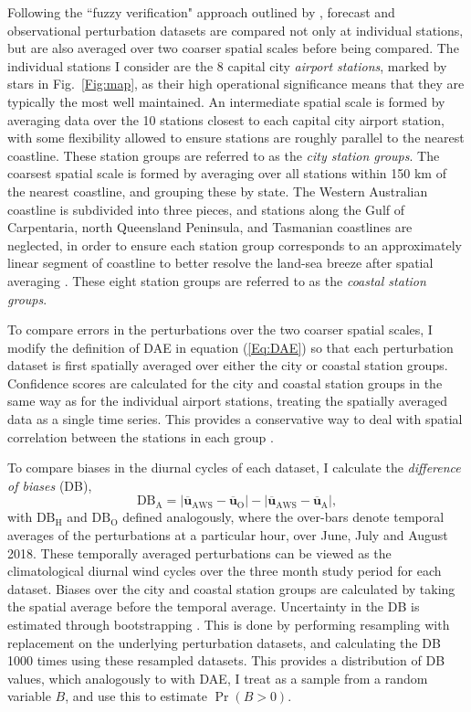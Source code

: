 \documentclass[twocol]{ametsoc}
\DeclareMathOperator{\pr}{Pr}
\begin{document}
Following the ``fuzzy verification" approach outlined by \citet{ebert08}, forecast and observational perturbation datasets are compared not only at individual stations, but are also averaged over two coarser spatial scales before being compared. The individual stations I consider are the 8 capital city \textit{airport stations}, marked by stars in Fig.~\ref{Fig:map}, as their high operational significance means that they are typically the most well maintained. An intermediate spatial scale is formed by averaging data over the 10 stations closest to each capital city airport station, with some flexibility allowed to ensure stations are roughly parallel to the nearest coastline. These station groups are referred to as the \textit{city station groups}. The coarsest spatial scale is formed by averaging over all stations within 150 km of the nearest coastline, and grouping these by state. The Western Australian coastline is subdivided into three pieces, and stations along the Gulf of Carpentaria, north Queensland Peninsula, and Tasmanian coastlines are neglected, in order to ensure each station group corresponds to an approximately linear segment of coastline to better resolve the land-sea breeze after spatial averaging \citep[e.g.][]{vincent16}. These eight station groups are referred to as the \textit{coastal station groups}.

To compare errors in the perturbations over the two coarser spatial scales, I modify the definition of DAE in equation (\ref{Eq:DAE}) so that each perturbation dataset is first spatially averaged over either the city or coastal station groups. Confidence scores are calculated for the city and coastal station groups in the same way as for the individual airport stations, treating the spatially averaged data as a single time series. This provides a conservative way to deal with spatial correlation between the stations in each group \citep{griffiths17}. 

To compare biases in the diurnal cycles of each dataset, I calculate the \textit{difference of biases} (DB),
\begin{equation}
\text{DB}_{\text{A}} = \left\lvert \overline{\mathbf{u}}_{\text{AWS}}-\overline{\mathbf{u}}_{\text{O}} \right\rvert - \left\lvert \overline{\mathbf{u}}_{\text{AWS}}-\overline{\mathbf{u}}_{\text{A}} \right\rvert,
\end{equation}
with $\text{DB}_{\text{H}}$ and $\text{DB}_{\text{O}}$ defined analogously, where the over-bars denote temporal averages of the perturbations at a particular hour, over June, July and August 2018. These temporally averaged perturbations can be viewed as the climatological diurnal wind cycles over the three month study period for each dataset. Biases over the city and coastal station groups are calculated by taking the spatial average before the temporal average. Uncertainty in the DB is estimated through bootstrapping \citep{efron79}. This is done by performing resampling with replacement on the underlying perturbation datasets, and calculating the DB 1000 times using these resampled datasets. This provides a distribution of DB values, which analogously to with DAE, I treat as a sample from a random variable $B$, and use this to estimate $\pr\left(B > 0\right)$.
\end{document}
